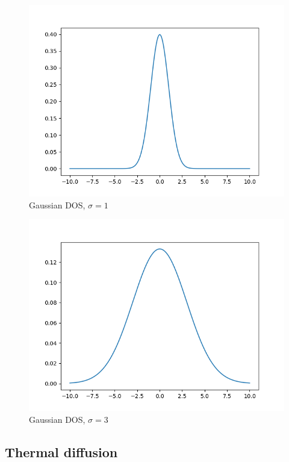 \begin{figure}
    \centering
    \includegraphics*[width=.5\paperwidth]{figures/DOS_1.png}
    \caption{Gaussian DOS, $\sigma=1$ \label{fig:5}}
\end{figure}

\begin{figure}
    \centering
    \includegraphics*[width=.5\paperwidth]{figures/DOS_3.png}
    \caption{Gaussian DOS, $\sigma=3$ \label{fig:6}}
\end{figure}

\subsection{Thermal diffusion}

